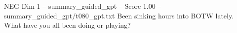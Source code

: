 \begin{textsample}{NEG Dim 1 – summary\_guided\_gpt – Score 1.00 – summary\_guided\_gpt/t080\_gpt.txt}  \label{ex:f1_neg_027}
Been sinking hours into BOTW lately.
What have you all been doing or playing?

\end{textsample}
